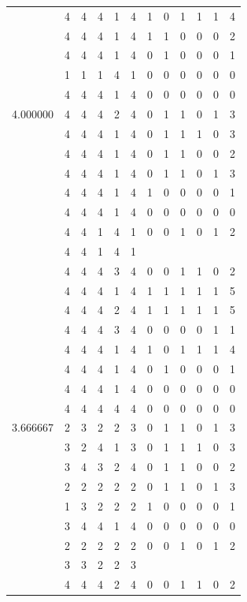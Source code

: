 \documentclass[]{book}
\theoremstyle{definition}
\theoremstyle{definition}
\theoremstyle{definition}
\theoremstyle{remark}
\begin{document}
\begin{table}
{\begin{tabular}[t]{rrrrrrrrrrrr}
 & 4 & 4 & 4 & 1 & 4 & 1 & 0 & 1 & 1 & 1 & 4\\
 & 4 & 4 & 4 & 1 & 4 & 1 & 1 & 0 & 0 & 0 & 2\\
 & 4 & 4 & 4 & 1 & 4 & 0 & 1 & 0 & 0 & 0 & 1\\
 & 1 & 1 & 1 & 4 & 1 & 0 & 0 & 0 & 0 & 0 & 0\\
 & 4 & 4 & 4 & 1 & 4 & 0 & 0 & 0 & 0 & 0 & 0\\
4.000000 & 4 & 4 & 4 & 2 & 4 & 0 & 1 & 1 & 0 & 1 & 3\\
 & 4 & 4 & 4 & 1 & 4 & 0 & 1 & 1 & 1 & 0 & 3\\
 & 4 & 4 & 4 & 1 & 4 & 0 & 1 & 1 & 0 & 0 & 2\\
 & 4 & 4 & 4 & 1 & 4 & 0 & 1 & 1 & 0 & 1 & 3\\
 & 4 & 4 & 4 & 1 & 4 & 1 & 0 & 0 & 0 & 0 & 1\\
 & 4 & 4 & 4 & 1 & 4 & 0 & 0 & 0 & 0 & 0 & 0\\
 & 4 & 4 & 1 & 4 & 1 & 0 & 0 & 1 & 0 & 1 & 2\\
 & 4 & 4 & 1 & 4 & 1 &  &  &  &  &  & \\
 & 4 & 4 & 4 & 3 & 4 & 0 & 0 & 1 & 1 & 0 & 2\\
 & 4 & 4 & 4 & 1 & 4 & 1 & 1 & 1 & 1 & 1 & 5\\
 & 4 & 4 & 4 & 2 & 4 & 1 & 1 & 1 & 1 & 1 & 5\\
 & 4 & 4 & 4 & 3 & 4 & 0 & 0 & 0 & 0 & 1 & 1\\
 & 4 & 4 & 4 & 1 & 4 & 1 & 0 & 1 & 1 & 1 & 4\\
 & 4 & 4 & 4 & 1 & 4 & 0 & 1 & 0 & 0 & 0 & 1\\
 & 4 & 4 & 4 & 1 & 4 & 0 & 0 & 0 & 0 & 0 & 0\\
 & 4 & 4 & 4 & 4 & 4 & 0 & 0 & 0 & 0 & 0 & 0\\
3.666667 & 2 & 3 & 2 & 2 & 3 & 0 & 1 & 1 & 0 & 1 & 3\\
 & 3 & 2 & 4 & 1 & 3 & 0 & 1 & 1 & 1 & 0 & 3\\
 & 3 & 4 & 3 & 2 & 4 & 0 & 1 & 1 & 0 & 0 & 2\\
 & 2 & 2 & 2 & 2 & 2 & 0 & 1 & 1 & 0 & 1 & 3\\
 & 1 & 3 & 2 & 2 & 2 & 1 & 0 & 0 & 0 & 0 & 1\\
 & 3 & 4 & 4 & 1 & 4 & 0 & 0 & 0 & 0 & 0 & 0\\
 & 2 & 2 & 2 & 2 & 2 & 0 & 0 & 1 & 0 & 1 & 2\\
 & 3 & 3 & 2 & 2 & 3 &  &  &  &  &  & \\
 & 4 & 4 & 4 & 2 & 4 & 0 & 0 & 1 & 1 & 0 & 2\\

\end{tabular}}
\end{table}
\end{document}
